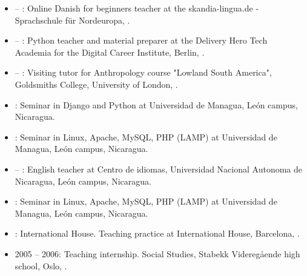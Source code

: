 \begin{itemize}

\item {} – : Online Danish for beginners teacher at the skandia-lingua.de - Sprachschule für Nordeuropa, \Germany.

\item {} – : Python teacher and material preparer at the Delivery Hero Tech Academia for the Digital Career Institute, Berlin, \Germany.

\item {} – : Visiting tutor for Anthropology course "Lowland South America", Goldsmiths College, University of London, \UK.

\item {}: Seminar in Django and Python at Universidad de Managua, León campus, Nicaragua.

\item {}: Seminar in Linux, Apache, MySQL, PHP (LAMP) at Universidad de Managua, León campus, Nicaragua.

\item {} – : English teacher at Centro de idiomas, Universidad Nacional Autonoma de Nicaragua, León campus, Nicaragua.

\item {}: Seminar in Linux, Apache, MySQL, PHP (LAMP) at Universidad de Managua, León campus, Nicaragua.

\item {}: International House. Teaching practice at International House, Barcelona, \Spain.

\item 2005 – 2006: Teaching internship. \english \und Social Studies, Stabekk Videregående high school, Oslo, \Norway.

\end{itemize}

